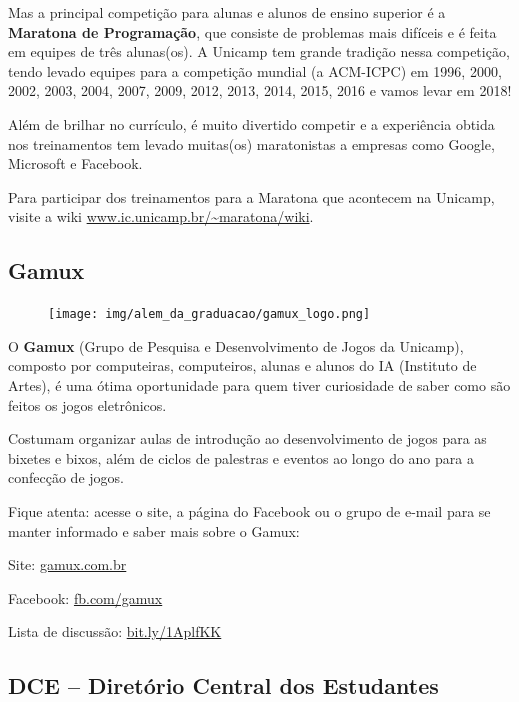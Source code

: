 Mas a principal competição para alunas e alunos de ensino superior é a
\textbf{Maratona de Programação}, que consiste de problemas mais difíceis e é
feita em equipes de três alunas(os). A Unicamp tem grande tradição nessa
competição, tendo levado equipes para a competição mundial (a ACM-ICPC) em
1996, 2000, 2002, 2003, 2004, 2007, 2009, 2012, 2013, 2014, 2015, 2016 e vamos
levar em 2018!

Além de brilhar no currículo, é muito divertido competir e a experiência obtida
nos treinamentos tem levado muitas(os) maratonistas a empresas como Google,
Microsoft e Facebook.

Para participar dos treinamentos para a Maratona que acontecem na Unicamp,
visite a wiki \url{www.ic.unicamp.br/~maratona/wiki}.

\subsection{Gamux}

\begin{figure}[h!]
  \centering
  \texttt{[image: img/alem\_da\_graduacao/gamux\_logo.png]}
\end{figure}

O \textbf{Gamux} (Grupo de Pesquisa e Desenvolvimen\-to de Jogos da Unicamp),
composto por computeiras, computeiros, alunas e alunos do IA (Instituto de
Artes), é uma ótima oportunidade para quem tiver curiosidade de saber como são
feitos os jogos eletrônicos.

Costumam organizar aulas de introdução ao desenvolvimento de jogos para as
bixetes e bixos, além de ciclos de palestras e eventos ao longo do ano para a
confecção de jogos.

Fique atenta: acesse o site, a página do Facebook ou o grupo de e-mail para se
manter informado e saber mais sobre o Gamux:

\begin{compactitemize}
\item Site: \url{gamux.com.br}
\item Facebook: \url{fb.com/gamux}
\item Lista de discussão: \url {bit.ly/1AplfKK}
\end{compactitemize}

\subsection{DCE -- Diretório Central dos Estudantes}

